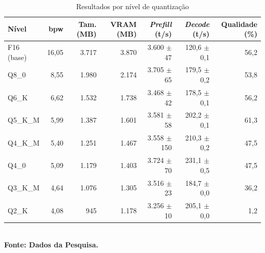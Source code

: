 \begin{table}[htb]
\centering
\caption{Resultados por nível de quantização}
\label{tab:resultados}
\begin{tabular}{lrrrrrr}
\hline
\textbf{Nível} & \textbf{bpw} & \textbf{Tam. (MB)} & \textbf{VRAM (MB)} & \textbf{\textit{Prefill} (t/s)} & \textbf{\textit{Decode} (t/s)} & \textbf{Qualidade (\%)} \\
\hline
F16 (base) & 16,05 & 3.717 & 3.870 & 3.600 $\pm$ 47 & 120,6 $\pm$ 0,1 & 56,2 \\
Q8\_0 & 8,55 & 1.980 & 2.174 & 3.705 $\pm$ 65 & 179,5 $\pm$ 0,2 & 53,8 \\
Q6\_K & 6,62 & 1.532 & 1.738 & 3.468 $\pm$ 42 & 178,5 $\pm$ 0,1 & 56,2 \\
Q5\_K\_M & 5,99 & 1.387 & 1.601 & 3.581 $\pm$ 58 & 202,2 $\pm$ 0,1 & 61,3 \\
Q4\_K\_M & 5,40 & 1.251 & 1.467 & 3.558 $\pm$ 150 & 210,3 $\pm$ 0,2 & 47,5 \\
Q4\_0 & 5,09 & 1.179 & 1.403 & 3.724 $\pm$ 70 & 231,1 $\pm$ 0,5 & 47,5 \\
Q3\_K\_M & 4,64 & 1.076 & 1.305 & 3.516 $\pm$ 23 & 184,7 $\pm$ 0,0 & 36,2 \\
Q2\_K & 4,08 & 945 & 1.178 & 3.256 $\pm$ 10 & 205,1 $\pm$ 0,0 & 1,2 \\
\hline
\end{tabular}
\\[2pt]{\footnotesize \textbf{Fonte: Dados da Pesquisa.}}
\end{table}

